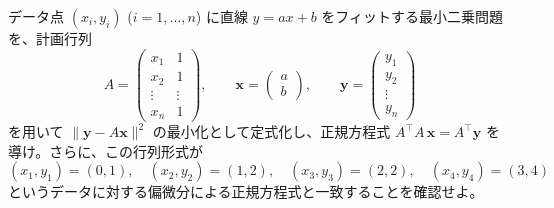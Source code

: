
データ点 $(x_i, y_i)$ ($i=1,\dots,n$) に直線 $y = ax + b$ をフィットする最小二乗問題を、計画行列
\[
A = \begin{pmatrix} x_1 & 1 \\ x_2 & 1 \\ \vdots & \vdots \\ x_n & 1 \end{pmatrix}, \qquad
\bm{x} = \begin{pmatrix} a \\ b \end{pmatrix}, \qquad
\bm{y} = \begin{pmatrix} y_1 \\ y_2 \\ \vdots \\ y_n \end{pmatrix}
\]
を用いて $\|\bm{y} - A\bm{x}\|^2$ の最小化として定式化し、正規方程式 $A^{\top}A\,\bm{x} = A^{\top}\bm{y}$ を導け。さらに、この行列形式が
\[
(x_1,y_1)=(0,1),\quad (x_2,y_2)=(1,2),\quad (x_3,y_3)=(2,2),\quad (x_4,y_4)=(3,4)
\]
というデータに対する偏微分による正規方程式と一致することを確認せよ。

